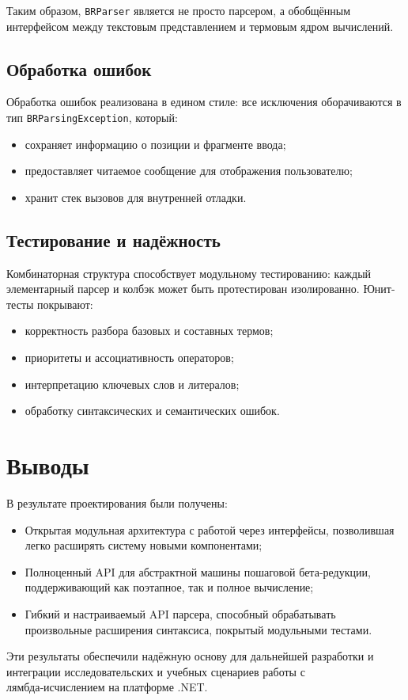Таким образом, \texttt{BRParser} является не просто парсером, а обобщённым интерфейсом между текстовым представлением и термовым ядром вычислений.

\subsection{Обработка ошибок}

Обработка ошибок реализована в едином стиле: все исключения оборачиваются в тип \texttt{BRParsingException}, который:

\begin{itemize}
  \item сохраняет информацию о позиции и фрагменте ввода;
  \item предоставляет читаемое сообщение для отображения пользователю;
  \item хранит стек вызовов для внутренней отладки.
\end{itemize}

\subsection{Тестирование и надёжность}

Комбинаторная структура способствует модульному тестированию: каждый элементарный парсер и колбэк может быть протестирован изолированно. Юнит-тесты покрывают:

\begin{itemize}
  \item корректность разбора базовых и составных термов;
  \item приоритеты и ассоциативность операторов;
  \item интерпретацию ключевых слов и литералов;
  \item обработку синтаксических и семантических ошибок.
\end{itemize}


\section{Выводы}

В результате проектирования были получены:
\begin{itemize}
  \item Открытая модульная архитектура с работой через интерфейсы, позволившая легко расширять систему новыми компонентами;
  \item Полноценный API для абстрактной машины пошаговой бета‑редукции, поддерживающий как поэтапное, так и полное вычисление;
  \item Гибкий и настраиваемый API парсера, способный обрабатывать произвольные расширения синтаксиса, покрытый модульными тестами.
\end{itemize}

Эти результаты обеспечили надёжную основу для дальнейшей разработки и интеграции исследовательских и учебных сценариев работы с лямбда‑исчислением на платформе .NET.
